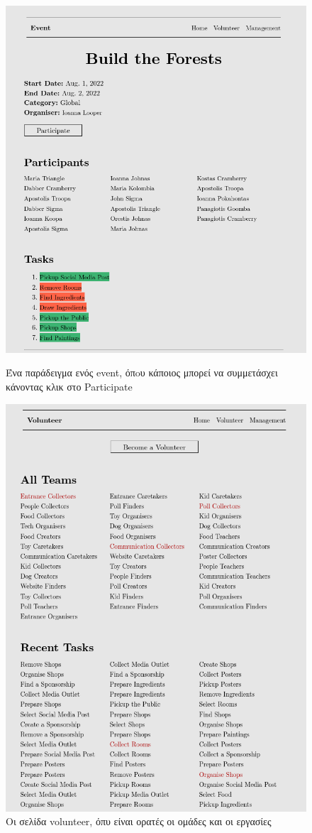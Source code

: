 \documentclass[manuscript,screen,review]{acmart}
\newcommand{\en}[1]{\foreignlanguage{english}{#1}}
\begin{document}
\begin{figure}[H]
 \centering
 \centering
    \includegraphics[width=.5\textwidth]{./images/eventparticipation.png}
    \caption{Ένα παράδειγμα ενός \en{event}, όπoυ κάποιος μπορεί να συμμετάσχει κάνοντας κλικ στο \en{Participate}}
    \includegraphics[width=.5\textwidth]{./images/volunteerpage.png}
    \caption{Οι σελίδα \en{volunteer}, όπυ είναι ορατές οι ομάδες και οι εργασίες}
   
     
\end{figure}
\end{document}
